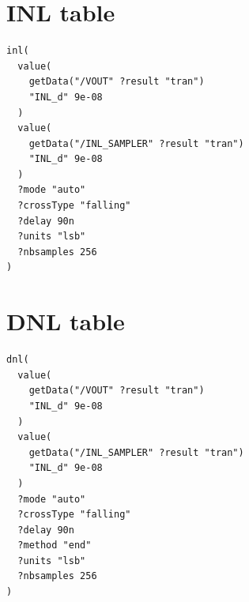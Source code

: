 \documentclass[english, 12pt, a4paper]{ifimaster}
\begin{document}
\begin{appendices}


\chapter{INL table}

\begin{lstlisting}[frame=single]
inl(
  value(
    getData("/VOUT" ?result "tran") 
    "INL_d" 9e-08
  ) 
  value(
    getData("/INL_SAMPLER" ?result "tran") 
    "INL_d" 9e-08
  )  
  ?mode "auto"
  ?crossType "falling" 
  ?delay 90n 
  ?units "lsb" 
  ?nbsamples 256
)
\end{lstlisting}




\chapter{DNL table}
\begin{lstlisting}[frame=single]
dnl(
  value(
    getData("/VOUT" ?result "tran") 
    "INL_d" 9e-08
  ) 
  value(
    getData("/INL_SAMPLER" ?result "tran") 
    "INL_d" 9e-08
  ) 
  ?mode "auto"  
  ?crossType "falling" 
  ?delay 90n 
  ?method "end" 
  ?units "lsb" 
  ?nbsamples 256
)
\end{lstlisting}



\end{appendices}
\end{document}
